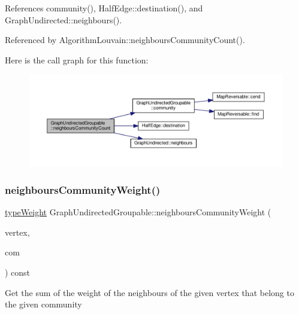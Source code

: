 References community(), Half\+Edge\+::destination(), and Graph\+Undirected\+::neighbours().



Referenced by Algorithm\+Louvain\+::neighbours\+Community\+Count().

Here is the call graph for this function\+:
\nopagebreak
\begin{figure}[H]
\begin{center}
\leavevmode
\includegraphics[width=350pt]{classGraphUndirectedGroupable_ae70ef901c94e0d117abbaa5cd64a63e6_cgraph}
\end{center}
\end{figure}
\mbox{\label{classGraphUndirectedGroupable_a23551b49c2cbf1b533e300af5c1f20da}} 
\subsubsection{\texorpdfstring{neighbours\+Community\+Weight()}{neighboursCommunityWeight()}\hspace{0.1cm}{\footnotesize\ttfamily [1/2]}}
{\footnotesize\ttfamily \hyperlink{edge_8h_a2e7ea3be891ac8b52f749ec73fee6dd2}{type\+Weight} Graph\+Undirected\+Groupable\+::neighbours\+Community\+Weight (\begin{DoxyParamCaption}\item[{const \hyperlink{edge_8h_a5fbd20c46956d479cb10afc9855223f6}{type\+Vertex} \&}]{vertex,  }\item[{const \hyperlink{graphUndirectedGroupable_8h_a914da95c9ea7f14f4b7f875c36818556}{type\+Community} \&}]{com }\end{DoxyParamCaption}) const\hspace{0.3cm}{\ttfamily [inline]}}

Get the sum of the weight of the neighbours of the given vertex that belong to the given community


